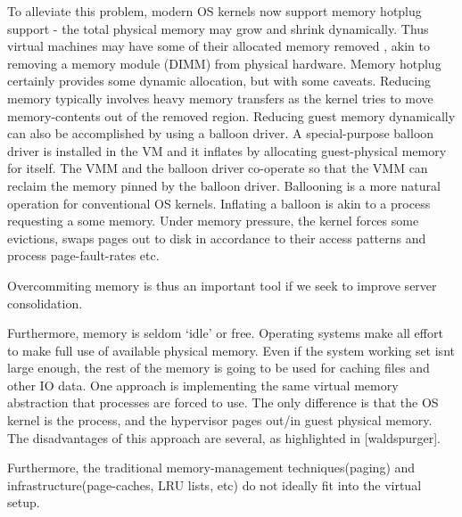 \documentclass[10pt,a4paper]{article}
\begin{document}
To alleviate this problem, modern OS kernels now support memory hotplug support - the total physical memory may grow and shrink dynamically. Thus virtual machines may have some of their allocated memory removed , akin to removing a memory module (DIMM) from  physical hardware. Memory hotplug certainly provides some dynamic allocation, but with some caveats. Reducing memory typically involves heavy memory transfers as the kernel tries to move memory-contents out of the removed region. 
Reducing guest memory dynamically can also be accomplished by using a balloon driver. A special-purpose balloon driver is installed in the VM and it inflates by allocating guest-physical memory for itself. The VMM and the balloon driver co-operate so that the VMM can reclaim the memory pinned by the balloon driver. Ballooning is a more natural operation for conventional OS kernels. Inflating a balloon is akin to a process requesting a some memory. Under memory pressure, the kernel forces some evictions, swaps pages out to disk in accordance to their access patterns and process page-fault-rates etc. 

Overcommiting memory is thus an important tool if we seek to improve server consolidation. 

Furthermore, memory is seldom `idle' or free. Operating systems make all effort to make full use of available physical memory. Even if the system working set isnt large enough, the rest of the memory is going to be used for caching files and other IO data. 
One approach is implementing the same virtual memory abstraction that processes are forced to use. 
The only difference is that the OS kernel is the process, and the hypervisor pages out/in guest physical memory. The disadvantages of this approach are several, as highlighted in [waldspurger].

Furthermore, the traditional memory-management techniques(paging) and infrastructure(page-caches, LRU lists, etc) do not ideally fit into the virtual setup. 
\end{document}
